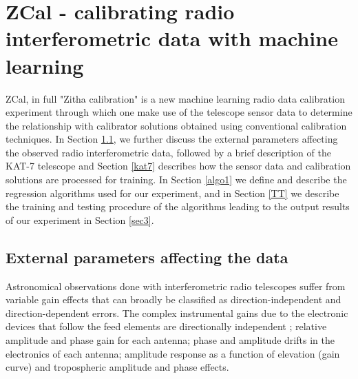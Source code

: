 \chapter{ZCal - calibrating radio interferometric data with machine learning}
\label{c3}
ZCal, in full "Zitha calibration" is a new machine learning radio data calibration experiment through which one make use of the telescope sensor data to determine the relationship with calibrator solutions obtained using conventional calibration techniques. In Section \ref{Exp}, we further discuss the external parameters affecting the observed radio interferometric data, followed by a brief description of the KAT-7 telescope and  Section \ref{kat7} describes how the sensor data and calibration solutions are processed for training. In Section \ref{algo1} we define and describe the regression algorithms used for our experiment, and in Section \ref{TT} we describe the training and testing procedure of the algorithms leading to the output results of our experiment in Section \ref{sec3}. 
\section{External parameters affecting the data}
\label{Exp}

Astronomical observations done with interferometric radio
telescopes suffer from variable gain effects that can
broadly be classified as direction-independent and direction-dependent errors. The complex instrumental gains due to the electronic devices that follow the feed elements are directionally independent \citep{bhatnagar2008correcting}; relative amplitude and phase gain for each antenna; phase and amplitude drifts in the electronics of each antenna; amplitude response as a function of elevation (gain curve) and tropospheric amplitude and phase effects.

